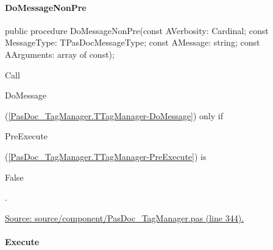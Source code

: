 \documentclass{report}
\newif\ifpdf
\begin{document}
\paragraph*{DoMessageNonPre}\hspace*{\fill}

\label{PasDoc_TagManager.TTagManager-DoMessageNonPre}
\begin{list}{}{
\setlength{\itemindent}{0cm}
\setlength{\listparindent}{0cm}
\setlength{\leftmargin}{\evensidemargin}
\addtolength{\leftmargin}{\tmplength}
\settowidth{\labelsep}{X}
\addtolength{\leftmargin}{\labelsep}
\setlength{\labelwidth}{\tmplength}
}
\item[\textbf{Declaration}\hfill]
\ifpdf
\begin{flushleft}
\fi
\begin{ttfamily}
public procedure DoMessageNonPre(const AVerbosity: Cardinal; const MessageType: TPasDocMessageType; const AMessage: string; const AArguments: array of const);\end{ttfamily}

\ifpdf
\end{flushleft}
\fi

\par
\item[\textbf{Description}]
Call \begin{ttfamily}DoMessage\end{ttfamily}(\ref{PasDoc_TagManager.TTagManager-DoMessage}) only if \begin{ttfamily}PreExecute\end{ttfamily}(\ref{PasDoc_TagManager.TTagManager-PreExecute}) is \begin{ttfamily}False\end{ttfamily}.\par
\href{https://github.com/pasdoc/pasdoc/blob/master/source/component/PasDoc_TagManager.pas#L344}{Source: source/component/PasDoc{\_}TagManager.pas (line 344).}

\end{list}
\paragraph*{Execute}\hspace*{\fill}
\end{document}
